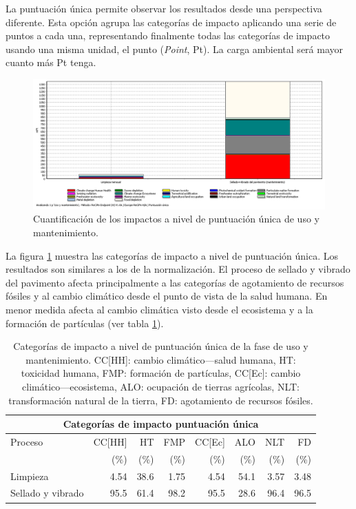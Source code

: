 La puntuación única permite observar los resultados desde una perspectiva diferente. Esta opción agrupa las categorías de impacto aplicando una serie de puntos a cada una, representando finalmente todas las categorías de impacto usando una misma unidad, el punto (\textit{Point}, Pt). La carga ambiental será mayor cuanto más Pt tenga.

\begin{figure}[!htb]
\centering
\includegraphics[width=15cm]{img/uso_puntuacionunica.png}
\caption{Cuantificación de los impactos a nivel de puntuación única de uso y mantenimiento.}
\label{fig:uso_puntuacionunica}
\end{figure}

La figura \ref{fig:uso_puntuacionunica} muestra las categorías de impacto a nivel de puntuación única. Los resultados son similares a los de la normalización. El proceso de sellado y vibrado del pavimento afecta principalmente a las categorías de agotamiento de recursos fósiles y al cambio climático desde el punto de vista de la salud humana. En menor medida afecta al cambio climática visto desde el ecosistema y a la formación de partículas (ver tabla \ref{categoriasimpactousopuntunica}).

\begin{table}[!htb]
\centering
\begin{tabular}{p{4cm}rrrrrrr}
\toprule
\multicolumn{8}{c}{Categorías de impacto puntuación única}\\
\midrule
Proceso & CC[HH] & HT & FMP & CC[Ec] & ALO & NLT & FD\\
 &  (\%) & (\%) & (\%) & (\%) & (\%) & (\%) & (\%)\\
\midrule
Limpieza & 4.54 & 38.6 & 1.75 & 4.54 & 54.1 & 3.57 & 3.48\\
Sellado y vibrado & 95.5 & 61.4 & 98.2 & 95.5 & 28.6 & 96.4 & 96.5\\
\bottomrule
\end{tabular}
\caption[Categorías de impacto a nivel de puntuación única de la fase de uso y mantenimiento.]{Categorías de impacto a nivel de puntuación única de la fase de uso y mantenimiento. CC[HH]: cambio climático—salud humana, HT: toxicidad humana, FMP: formación de partículas, CC[Ec]: cambio climático—ecosistema, ALO: ocupación de tierras agrícolas, NLT: transformación natural de la tierra, FD: agotamiento de recursos fósiles.}
\label{categoriasimpactousopuntunica}
\end{table}


